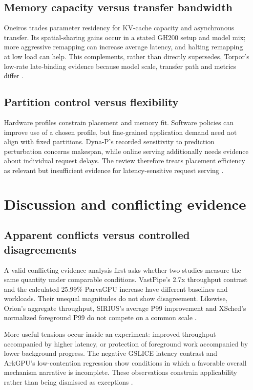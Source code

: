 \subsection{Memory capacity versus transfer bandwidth}
Oneiros trades parameter residency for KV-cache capacity and asynchronous transfer. Its spatial-sharing gains occur in a stated GH200 setup and model mix; more aggressive remapping can increase average latency, and halting remapping at low load can help. This complements, rather than directly supersedes, Torpor's low-rate late-binding evidence because model scale, transfer path and metrics differ \cite{P012,s026}.

\subsection{Partition control versus flexibility}
Hardware profiles constrain placement and memory fit. Software policies can improve use of a chosen profile, but fine-grained application demand need not align with fixed partitions. Dyna-P's recorded sensitivity to prediction perturbation concerns makespan, while online serving additionally needs evidence about individual request delays. The review therefore treats placement efficiency as relevant but insufficient evidence for latency-sensitive request serving \cite{P020}.

\section{Discussion and conflicting evidence}
\subsection{Apparent conflicts versus controlled disagreements}
A valid conflicting-evidence analysis first asks whether two studies measure the same quantity under comparable conditions. VastPipe's 2.7x throughput contrast and the calculated 25.99\% ParvaGPU increase have different baselines and workloads. Their unequal magnitudes do not show disagreement. Likewise, Orion's aggregate throughput, SIRIUS's average P99 improvement and XSched's normalized foreground P99 do not compete on a common scale \cite{P001,P007,P010,P011,P015}.

More useful tensions occur inside an experiment: improved throughput accompanied by higher latency, or protection of foreground work accompanied by lower background progress. The negative GSLICE latency contrast and ArkGPU's low-contention regression show conditions in which a favorable overall mechanism narrative is incomplete. These observations constrain applicability rather than being dismissed as exceptions \cite{P008,P019}.

